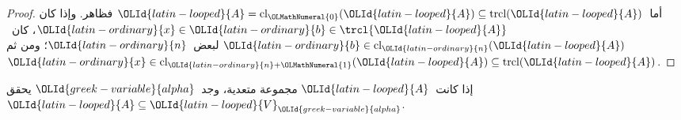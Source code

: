 \documentclass[../../../include/open-logic-section]{subfiles}
\begin{document}
\begin{proof}
أما~$\OLId{latin-looped}{A} = \text{cl}_\OLMathNumeral{0}(\OLId{latin-looped}{A}) \subseteq \text{trcl}(\OLId{latin-looped}{A})$ فظاهر. وإذا كان
$\OLId{latin-ordinary}{x} \in \OLId{latin-ordinary}{b} \in \trcl{\OLId{latin-looped}{A}}$، كان~$\OLId{latin-ordinary}{b} \in \text{cl}_\OLId{latin-ordinary}{n}(\OLId{latin-looped}{A})$ لبعض~$\OLId{latin-ordinary}{n}$؛ ومن ثم
$\OLId{latin-ordinary}{x} \in \text{cl}_{\OLId{latin-ordinary}{n}+\OLMathNumeral{1}}(\OLId{latin-looped}{A}) \subseteq \text{trcl}(\OLId{latin-looped}{A})$.
\end{proof}

\begin{lem}
إذا كانت~$\OLId{latin-looped}{A}$ مجموعة متعدية، وجد~$\OLId{greek-variable}{alpha}$ يحقق
$\OLId{latin-looped}{A} \subseteq \OLId{latin-looped}{V}_\OLId{greek-variable}{alpha}$.
\end{lem}
\end{document}

